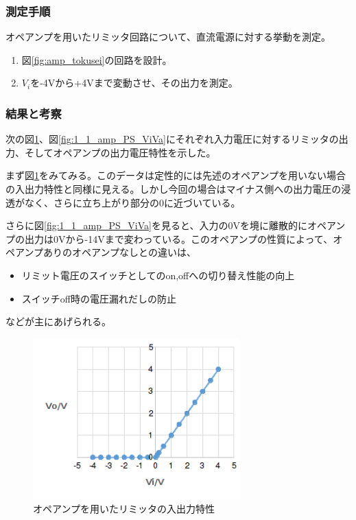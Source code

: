 \documentclass[11pt,a4j]{jsarticle}
\begin{document}
   \subsubsection{測定手順}
    オペアンプを用いたリミッタ回路について、直流電源に対する挙動を測定。
    \begin{enumerate}
    \item 図\ref{fig:amp_tokusei}の回路を設計。
    \item $V_i$を-4Vから+4Vまで変動させ、その出力を測定。
    \end{enumerate}
    
   \subsubsection{結果と考察}
    次の図\ref{fig:1_1_amp_PS_ViVo}、図\ref{fig:1_1_amp_PS_ViVa}にそれぞれ入力電圧に対するリミッタの出力、そしてオペアンプの出力電圧特性を示した。
    
    まず図\ref{fig:1_1_amp_PS_ViVo}をみてみる。このデータは定性的には先述のオペアンプを用いない場合の入出力特性と同様に見える。しかし今回の場合はマイナス側への出力電圧の浸透がなく、さらに立ち上がり部分の0に近づいている。
    
    さらに図\ref{fig:1_1_amp_PS_ViVa}を見ると、入力の0Vを境に離散的にオペアンプの出力は0Vから-14Vまで変わっている。このオペアンプの性質によって、オペアンプありのオペアンプなしとの違いは、
    \begin{itemize}
    \item リミット電圧のスイッチとしてのon,offへの切り替え性能の向上
    \item スイッチoff時の電圧漏れだしの防止
    \end{itemize}
    などが主にあげられる。
    
    \begin{figure}[htbp]
  \centering
  \includegraphics[width=8cm,clip]{1_1_amp_PS_ViVo.png}
  \caption{オペアンプを用いたリミッタの入出力特性}
  \label{fig:1_1_amp_PS_ViVo}
 \end{figure}%
   
\end{document}
